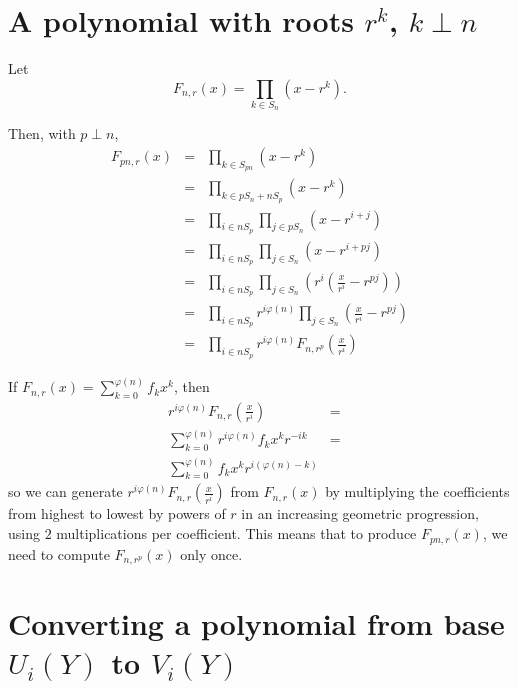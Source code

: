 \documentclass{article}
\begin{document}
\section{A polynomial with roots $r^k$, $k\perp n$}

Let
\begin{displaymath}
F_{n,r}(x) = \prod_{k \in S_n} (x-r^k).
\end{displaymath}

Then, with $p \perp n$,
\begin{eqnarray*}
F_{pn,r}(x) & = & \prod_{k \in S_{pn}} \left(x-r^k\right) \\
            & = & \prod_{k \in pS_n + nS_p} \left(x-r^k\right) \\
            & = & \prod_{i \in nS_p} \prod_{j \in pS_n} \left(x-r^{i+j}\right) \\
            & = & \prod_{i \in nS_p} \prod_{j \in S_n} \left(x-r^{i+pj}\right) \\
            & = & \prod_{i \in nS_p} \prod_{j \in S_n} \left(r^i \left(\frac{x}{r^i}-r^{pj}\right)\right) \\
            & = & \prod_{i \in nS_p} r^{i\varphi(n)} \prod_{j \in S_n} \left(\frac{x}{r^i}-r^{pj}\right) \\
            & = & \prod_{i \in nS_p} r^{i\varphi(n)} F_{n,r^p}\left(\frac{x}{r^i}\right)
\end{eqnarray*}

If $F_{n,r}(x) = \sum_{k=0}^{\varphi(n)} f_k x^k$, then 
\begin{eqnarray*}
r^{i\varphi(n)} F_{n,r}\left(\frac{x}{r^i}\right) & = &\\
\sum_{k=0}^{\varphi(n)} r^{i\varphi(n)} f_k x^k r^{-ik} & = & \\
\sum_{k=0}^{\varphi(n)} f_k x^k r^{i(\varphi(n)-k)} &&
\end{eqnarray*}
so we can generate $r^{i\varphi(n)} F_{n,r}\left(\frac{x}{r^i}\right)$ from 
$F_{n,r}(x)$ by multiplying the coefficients from highest to lowest by powers 
of $r$ in an increasing geometric progression, using $2$ multiplications 
per coefficient. This means that to produce $F_{pn,r}(x)$, we need to compute 
$F_{n,r^p}(x)$ only once.

\pagebreak[4]

\section {Converting a polynomial from base $U_i(Y)$ to $V_i(Y)$}
\end{document}
